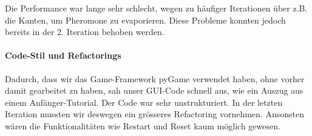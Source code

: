 Die Performance war lange sehr schlecht, wegen zu häufiger Iterationen über z.B.
die Kanten, um Pheromone zu evaporieren. Diese Probleme konnten jedoch bereits
in der 2. Iteration behoben werden.

\paragraph*{Code-Stil und Refactorings}

Dadurch, dass wir das Game-Framework pyGame verwendet haben, ohne vorher damit
gearbeitet zu haben, sah unser GUI-Code schnell aus, wie ein Auszug aus einem
Anfänger-Tutorial. Der Code war sehr unstrukturiert. In der letzten Iteration
mussten wir deswegen ein grösseres Refactoring vornehmen. Ansonsten wären die
Funktionalitäten wie Restart und Reset kaum möglich gewesen.